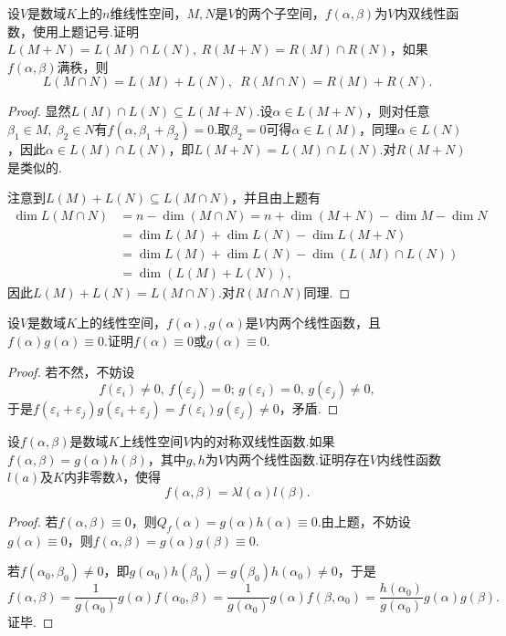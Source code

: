 \begin{prob}[19]
	设$V$是数域$K$上的$n$维线性空间，$M,N$是$V$的两个子空间，$f(\alpha,\beta)$为$V$内双线性函数，使用上题记号.证明$L(M+N)=L(M)\cap L(N),\ R(M+N)=R(M)\cap R(N)$，如果$f(\alpha,\beta)$满秩，则
	\[
		L(M\cap N)=L(M)+L(N),\enspace R(M\cap N)=R(M)+R(N).
	\]
\end{prob}
\begin{proof}
	显然$L(M)\cap L(N)\subseteq L(M+N)$.设$\alpha\in L(M+N)$，则对任意$\beta_1\in M,\ \beta_2\in N$有$f(\alpha,\beta_1+\beta_2)=0$.取$\beta_2=0$可得$\alpha\in L(M)$，同理$\alpha\in L(N)$，因此$\alpha\in L(M)\cap L(N)$，即$L(M+N)=L(M)\cap L(N)$.对$R(M+N)$是类似的.

	注意到$L(M)+L(N)\subseteq L(M\cap N)$，并且由上题有
	\begin{align*}
		\dim L(M\cap N) & =n-\dim(M\cap N)=n+\dim(M+N)-\dim M-\dim N \\
		                & =\dim L(M)+\dim L(N)-\dim L(M+N)           \\
		                & =\dim L(M)+\dim L(N)-\dim (L(M)\cap L(N))  \\
		                & =\dim(L(M)+L(N)),
	\end{align*}
	因此$L(M)+L(N)=L(M\cap N)$.对$R(M\cap N)$同理.
\end{proof}
\begin{prob}[20]
	设$V$是数域$K$上的线性空间，$f(\alpha),g(\alpha)$是$V$内两个线性函数，且$f(\alpha)g(\alpha)\equiv 0$.证明$f(\alpha)\equiv 0$或$g(\alpha)\equiv 0$.
\end{prob}
\begin{proof}
	若不然，不妨设
	\[
		f(\varepsilon_i)\ne0,\,f(\varepsilon_j)=0;\,g(\varepsilon_i)=0,\,g(\varepsilon_j)\ne0,
	\]
	于是$f(\varepsilon_i+\varepsilon_j)g(\varepsilon_i+\varepsilon_j)=f(\varepsilon_i)g(\varepsilon_j)\ne0$，矛盾.
\end{proof}
\begin{prob}[21]
	设$f(\alpha,\beta)$是数域$K$上线性空间$V$内的对称双线性函数.如果$f(\alpha,\beta)=g(\alpha)h(\beta)$，其中$g,h$为$V$内两个线性函数.证明存在$V$内线性函数$l(a)$及$K$内非零数$\lambda$，使得
	\[
		f(\alpha,\beta)=\lambda l(\alpha)l(\beta).
	\]
\end{prob}
\begin{proof}
	若$f(\alpha,\beta)\equiv 0$，则$Q_f(\alpha)=g(\alpha)h(\alpha)\equiv 0$.由上题，不妨设$g(\alpha)\equiv 0$，则$f(\alpha,\beta)=g(\alpha)g(\beta)\equiv 0$.

	若$f(\alpha_0,\beta_0)\ne0$，即$g(\alpha_0)h(\beta_0)=g(\beta_0)h(\alpha_0)\ne0$，于是
	\[
		f(\alpha,\beta)=\frac{1}{g(\alpha_0)}g(\alpha)f(\alpha_0,\beta)=\frac{1}{g(\alpha_0)}g(\alpha)f(\beta,\alpha_0)=\frac{h(\alpha_0)}{g(\alpha_0)}g(\alpha)g(\beta).
	\]
	证毕.
\end{proof}
